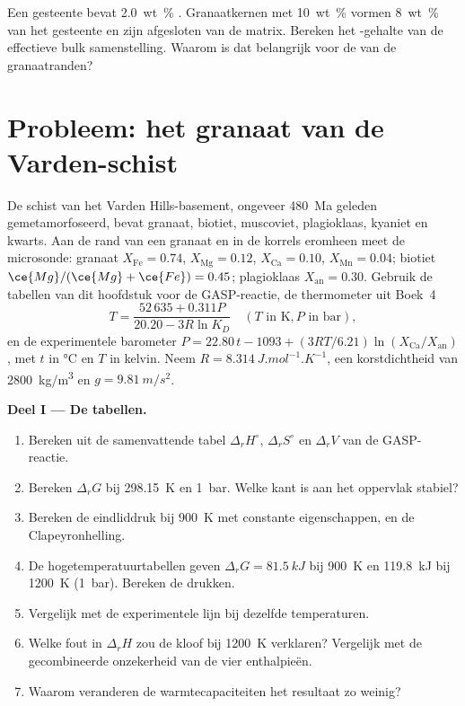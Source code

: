 \begin{exercise}[$\star\star\star$]\label{exo:b3:petrological-thermodynamics:12}
Een gesteente bevat \qty{2.0}{wt\percent} . Granaatkernen met
\qty{10}{wt\percent}  vormen \qty{8}{wt\percent} van het gesteente en zijn
afgesloten van de matrix. Bereken het -gehalte van de effectieve bulk
samenstelling. Waarom is dat belangrijk voor de  van de granaatranden?
\end{exercise}

\section{Probleem: het granaat van de Varden-schist}

\begin{problem}
\label{pb:b3:petrological-thermodynamics:1}
De schist van het Varden Hills-basement, ongeveer
\qty{480}{Ma} geleden gemetamorfoseerd, bevat granaat, biotiet, muscoviet, plagioklaas, kyaniet en
kwarts. Aan de rand van een granaat en in de korrels eromheen meet de microsonde:
granaat $X_{\text{Fe}} = 0.74$, $X_{\text{Mg}} = 0.12$, $X_{\text{Ca}} =
0.10$, $X_{\text{Mn}} = 0.04$; biotiet $\ce{Mg}/(\ce{Mg} + \ce{Fe}) = 0.45$;
plagioklaas $X_{\text{an}} = 0.30$. Gebruik de tabellen van dit hoofdstuk voor de
GASP-reactie, de thermometer uit Boek~4
\[
T = \frac{52\,635 + 0.311P}{20.20 - 3R\ln K_D}\quad(T \text{ in K}, P
\text{ in bar}),
\]
en de experimentele barometer $P = 22.80\,t - 1093 + (3RT/6.21)\ln
(X_{\text{Ca}}/X_{\text{an}})$, met $t$ in \unit{\celsius} en $T$ in
kelvin. Neem $R = \qty{8.314}{J.mol^{-1}.K^{-1}}$, een korstdichtheid van
\qty{2800}{kg/m^3} en $g = \qty{9.81}{m/s^2}$.

\medskip\noindent\textbf{Deel I --- De tabellen.}
\begin{enumerate}
  \item Bereken uit de samenvattende tabel $\Delta_rH^\circ$, $\Delta_rS^\circ$
        en $\Delta_rV$ van de GASP-reactie.
  \item Bereken $\Delta_rG$ bij \qty{298.15}{K} en \qty{1}{bar}. Welke kant
        is aan het oppervlak stabiel?
  \item Bereken de eindliddruk bij \qty{900}{K} met constante
        eigenschappen, en de Clapeyronhelling.
  \item De hogetemperatuurtabellen geven $\Delta_rG = \qty{81.5}{kJ}$ bij
        \qty{900}{K} en \qty{119.8}{kJ} bij \qty{1200}{K} (\qty{1}{bar}).
        Bereken de drukken.
  \item Vergelijk met de experimentele lijn bij dezelfde temperaturen.
  \item Welke fout in $\Delta_rH$ zou de kloof bij \qty{1200}{K} verklaren?
        Vergelijk met de gecombineerde onzekerheid van de vier enthalpieën.
  \item Waarom veranderen de warmtecapaciteiten het resultaat zo weinig?
\end{enumerate}


\end{problem}

